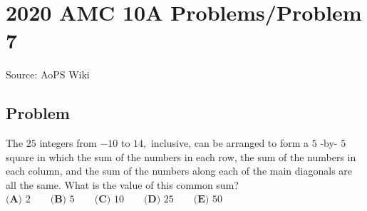 \documentclass[12pt]{article}
\begin{document}
\section*{{2020 AMC 10A Problems/Problem 7}}
Source: AoPS Wiki

\subsection*{Problem}
The $25$ integers from $-10$ to $14,$ inclusive, can be arranged to form a $5$ -by- $5$ square in which the sum of the numbers in each row, the sum of the numbers in each column, and the sum of the numbers along each of the main diagonals are all the same. What is the value of this common sum? $\textbf{(A) }2 \qquad\textbf{(B) } 5\qquad\textbf{(C) } 10\qquad\textbf{(D) } 25\qquad\textbf{(E) } 50$
\end{document}

